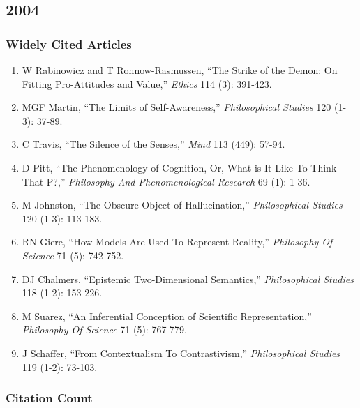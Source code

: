 \documentclass[
  10pt,
  letterpaper,
  DIV=11,
  numbers=noendperiod,
  twoside]{scrartcl}
\providecommand{\tightlist}{%
  \setlength{\itemsep}{0pt}\setlength{\parskip}{0pt}}\usepackage{longtable,booktabs,array}
\begin{document}
\newpage

\subsection{2004}\label{sec-s2004}

\subsubsection*{Widely Cited Articles}\label{widely-cited-articles-28}

\begin{enumerate}
\def\labelenumi{\arabic{enumi}.}
\tightlist
\item
  W Rabinowicz and T Ronnow-Rasmussen, ``The Strike of the Demon: On
  Fitting Pro-Attitudes and Value,'' \emph{Ethics} 114 (3): 391-423.
\item
  MGF Martin, ``The Limits of Self-Awareness,'' \emph{Philosophical
  Studies} 120 (1-3): 37-89.
\item
  C Travis, ``The Silence of the Senses,'' \emph{Mind} 113 (449): 57-94.
\item
  D Pitt, ``The Phenomenology of Cognition, Or, What is It Like To Think
  That P?,'' \emph{Philosophy And Phenomenological Research} 69 (1):
  1-36.
\item
  M Johnston, ``The Obscure Object of Hallucination,''
  \emph{Philosophical Studies} 120 (1-3): 113-183.
\item
  RN Giere, ``How Models Are Used To Represent Reality,''
  \emph{Philosophy Of Science} 71 (5): 742-752.
\item
  DJ Chalmers, ``Epistemic Two-Dimensional Semantics,''
  \emph{Philosophical Studies} 118 (1-2): 153-226.
\item
  M Suarez, ``An Inferential Conception of Scientific Representation,''
  \emph{Philosophy Of Science} 71 (5): 767-779.
\item
  J Schaffer, ``From Contextualism To Contrastivism,''
  \emph{Philosophical Studies} 119 (1-2): 73-103.
\end{enumerate}

\subsubsection*{Citation Count}\label{sec-count-2004}
\end{document}
